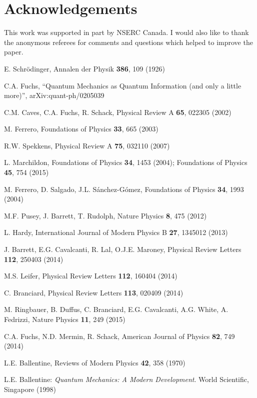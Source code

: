 \documentclass[final,3p,times,twocolumn]{elsarticle3}
\begin{document}
\section*{Acknowledgements}
This work was supported in part by NSERC Canada.
I would also like to thank the anonymous referees for comments and
questions which helped to improve the paper.


\begin{thebibliography}{88}

E. Schr\"odinger, Annalen der Physik {\bf 386}, 109 (1926)

C.A. Fuchs, ``Quantum Mechanics as Quantum Information (and only a little more)'',
arXiv:quant-ph/0205039

C.M. Caves, C.A. Fuchs, R. Schack, 
Physical Review A {\bf 65}, 022305 (2002)

M. Ferrero, Foundations of Physics {\bf 33}, 665 (2003)

R.W. Spekkens, Physical Review A {\bf 75}, 032110 (2007)

L. Marchildon, Foundations of Physics {\bf 34}, 1453 (2004);
Foundations of Physics {\bf 45}, 754 (2015)

M. Ferrero, D. Salgado, J.L. S\'anchez-G\'omez, Foundations of Physics {\bf 34}, 1993 (2004)

M.F. Pusey, J. Barrett, T. Rudolph,
Nature Physics {\bf 8}, 475 (2012)

L. Hardy, International Journal of Modern Physics B {\bf 27}, 1345012 (2013)

J. Barrett, E.G. Cavalcanti, R. Lal, O.J.E. Maroney,
Physical Review Letters {\bf 112}, 250403 (2014)

M.S. Leifer, Physical Review Letters {\bf 112}, 160404 (2014)

C. Branciard, Physical Review Letters {\bf 113}, 020409 (2014)

M. Ringbauer, B. Duffus, C. Branciard, E.G. Cavalcanti,	A.G. White, A. Fedrizzi,
Nature Physics {\bf 11}, 249 (2015)

C.A. Fuchs, N.D. Mermin, R. Schack, American Journal of Physics {\bf 82}, 749 (2014)

L.E. Ballentine, Reviews of Modern Physics {\bf 42}, 358 (1970)

L.E. Ballentine: {\it Quantum Mechanics: A Modern Development}.
World Scientific, Singapore (1998)


\end{thebibliography}
\end{document}
